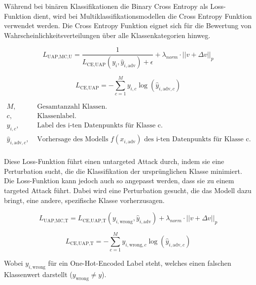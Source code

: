 Während bei binären Klassifikationen die Binary Cross Entropy als Loss-Funktion dient, wird bei Multiklassifikationsmodellen die Cross Entropy Funktion verwendet werden. Die Cross Entropy Funktion eignet sich für die Bewertung von Wahrscheinlichkeitsverteilungen über alle Klassenkategorien hinweg.

\begin{equation}
    L_{\text{UAP,MC,U}} = \frac{1}{L_{\text{CE,UAP}}(y_i, \hat{y}_{i,\text{adv}}) + \epsilon} + \lambda_{norm} \cdot ||v + \Delta v||_p 
\label{eq:Loss L_UAP_CE}
\end{equation}

\begin{equation}
L_{\text{CE,UAP}} = -\sum_{c=1}^My_{i,c}\log(\hat{y}_{i,\text{adv},c})
\label{eq:Loss L_CE_UAP}
\end{equation}

\begin{align*}
M,                &\text{ Gesamtanzahl Klassen.} \\
c,                &\text{ Klassenlabel.} \\
y_{i,c},          &\text{ Label des i-ten Datenpunkts für Klasse c.} \\
\hat{y}_{i,\text{adv},c},    &\text{ Vorhersage des Modells $f(x_{i,\text{adv}})$ des i-ten Datenpunkts für Klasse c.} \\
\end{align*}

Diese Loss-Funktion führt einen untargeted Attack durch, indem sie eine Perturbation sucht, die die Klassifikation der ursprünglichen Klasse minimiert. Die Loss-Funktion kann jedoch auch so angepasst werden, dass sie zu einem targeted Attack führt. Dabei wird eine Perturbation gesucht, die das Modell dazu bringt, eine andere, spezifische Klasse vorherzusagen.

\begin{equation}
    L_{\text{UAP,MC,T}} = L_{\text{CE,UAP,T}}(y_{i,\text{wrong}}, \hat{y}_{i,\text{adv}}) + \lambda_{norm} \cdot ||v + \Delta v||_p 
\label{eq:Loss L_UAP_CE_Targeted}
\end{equation}

\begin{equation}
L_{\text{CE,UAP,T}} = -\sum_{c=1}^M y_{i,\text{wrong},c}\log(\hat{y}_{i,\text{adv},c})
\label{eq:Loss L_CE}
\end{equation}

Wobei $y_{i,\text{wrong}}$ für ein One-Hot-Encoded Label steht, welches einen falschen Klassenwert darstellt ($y_\text{wrong} \neq y$).


